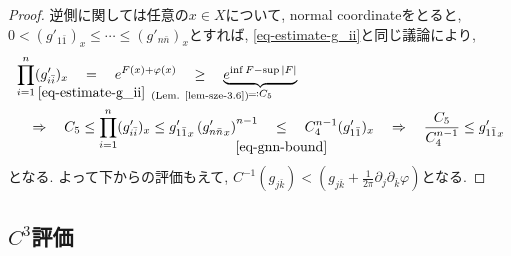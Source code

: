 \documentclass[dvipdfmx,a4paper,11pt]{article} %
\theoremstyle{definition}
\theoremstyle{remark}
\numberwithin{equation}{section}
\newcommand{\underalign}[2]{%
  \quad
  \underset{\mathclap{\raisebox{-1.6ex}{\ensuremath{\scriptstyle #1}}}}{#2}
  \quad
}
\begin{document}
\begin{proof}
逆側に関しては任意の$x \in X$について, normal coordinateをとると, $0 < (g'_{1\bar{1}})_x\leq \cdots \leq (g'_{n\bar{n}})_x$とすれば, 
\eqref{eq-estimate-g_ii}と同じ議論により, 
\[
\begin{aligned}
&\prod_{i=1}^n (g'_{i\bar i})_x
\underalign{\eqref{eq-estimate-g_ii}}{=}e^{F(x)+\varphi(x)}
\underalign{\text{(Lem. \ref{lem-sze-3.6})}}{\geq}
\underbrace{e^{\inf F - \sup |F|}}_{\eqqcolon C_5}
\\
&\underalign{}{\Rightarrow}
C_5 \leq \prod_{i=1}^n (g'_{i\bar i})_x \leq {g'_{1\bar{1}} }_x \left( {g'_{n\bar{n}}}_x\right)^{n-1}
\underalign{\eqref{eq-gnn-bound}}{\leq} C_{4}^{n-1} (g'_{1\bar{1}})_x  
\underalign{}{\Rightarrow}
\frac{C_5}{C_{4}^{n-1}} \leq  {g'_{1\bar{1}} }_x  
\end{aligned}
\]
となる. よって下からの評価もえて, $C^{-1}(g_{j\bar k})<(g_{j\bar k}+\frac{1}{2\pi}\partial_j\partial_{\bar k}\varphi)$となる. 
\end{proof}

\subsection{$C^{3}$評価}

\end{document}

